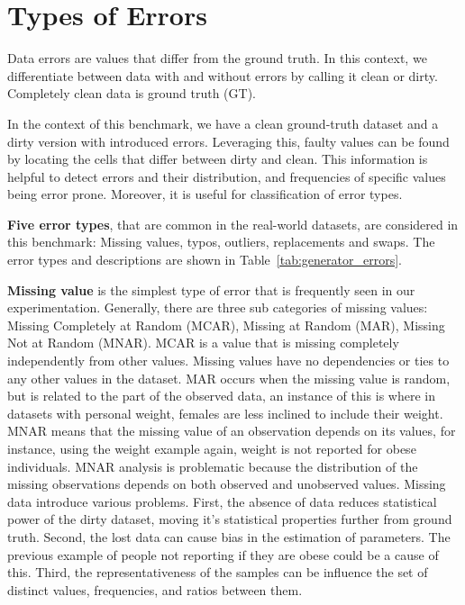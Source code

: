 \section{Types of Errors}
\label{sec:error_types}

Data errors are values that differ from the ground truth.
In this context, we differentiate between data with and without errors by calling it clean or dirty. 
Completely clean data is ground truth (GT).  


In the context of this benchmark, we have a clean ground-truth dataset and a dirty version with introduced errors.  
Leveraging this, faulty values can be found by locating the cells that differ between dirty and clean. 
This information is helpful to detect errors and their distribution, and frequencies of specific values being error prone.  
Moreover, it is useful for classification of error types.


\textbf{Five error types}, that are common in the real-world datasets, are considered in this benchmark: 
Missing values, typos, outliers, replacements and swaps. 
The error types and descriptions are shown in Table~\ref{tab:generator_errors}.


\textbf{Missing value} is the simplest type of error that is frequently seen in our experimentation. 
Generally, there are three sub categories of missing values: 
Missing Completely at Random (MCAR), Missing at Random (MAR), Missing Not at Random (MNAR). 
MCAR is a value that is missing completely independently from other values. 
Missing values have no dependencies or ties to any other values in the dataset. 
MAR occurs when the missing value is random, but is related to the part of the observed data, an instance of this is where in datasets with personal weight, females are less inclined to include their weight. 
MNAR means that the missing value of an observation depends on its values, for instance, using the weight example again, weight is not reported for obese individuals.
MNAR analysis is problematic because the distribution of the missing observations depends on both observed and unobserved values.
Missing data introduce various problems. 
First, the absence of data reduces statistical power of the dirty dataset, moving it's statistical properties further from ground truth.
Second, the lost data can cause bias in the estimation of parameters. The previous example of people not reporting if they are obese could be a cause of this. 
Third, the representativeness of the samples can be influence the set of distinct values, frequencies, and ratios between them.


